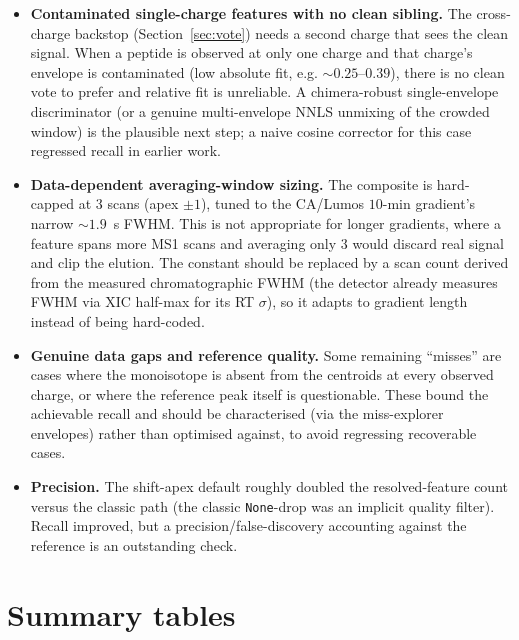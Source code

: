 \documentclass[11pt]{article}
\begin{document}
\begin{itemize}[leftmargin=1.4em]
  \item \textbf{Contaminated single-charge features with no clean sibling.} The cross-charge
  backstop (Section~\ref{sec:vote}) needs a second charge that sees the clean signal. When a peptide
  is observed at only one charge and that charge's envelope is contaminated (low absolute fit, e.g.
  $\sim0.25$--$0.39$), there is no clean vote to prefer and relative fit is unreliable. A
  chimera-robust single-envelope discriminator (or a genuine multi-envelope NNLS unmixing of the
  crowded window) is the plausible next step; a naive cosine corrector for this case regressed recall
  in earlier work.
  \item \textbf{Data-dependent averaging-window sizing.} The composite is hard-capped at $3$ scans
  (apex $\pm 1$), tuned to the CA/Lumos $10$-min gradient's narrow $\sim1.9$~s FWHM. This is not
  appropriate for longer gradients, where a feature spans more MS1 scans and averaging only $3$ would
  discard real signal and clip the elution. The constant should be replaced by a scan count derived
  from the measured chromatographic FWHM (the detector already measures FWHM via XIC half-max for its
  RT $\sigma$), so it adapts to gradient length instead of being hard-coded.
  \item \textbf{Genuine data gaps and reference quality.} Some remaining ``misses'' are cases where
  the monoisotope is absent from the centroids at every observed charge, or where the reference peak
  itself is questionable. These bound the achievable recall and should be characterised (via the
  miss-explorer envelopes) rather than optimised against, to avoid regressing recoverable cases.
  \item \textbf{Precision.} The shift-apex default roughly doubled the resolved-feature count versus
  the classic path (the classic \texttt{None}-drop was an implicit quality filter). Recall improved,
  but a precision/false-discovery accounting against the reference is an outstanding check.
\end{itemize}

\section*{Summary tables}
\end{document}

